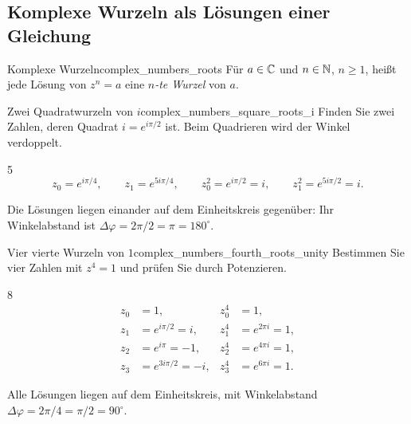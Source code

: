 \clearpage
\subsection{Komplexe Wurzeln als Lösungen einer Gleichung}
\begin{DefinitionBox}{Komplexe Wurzeln}{complex_numbers_roots}
  Für $a\in\mathbb{C}$ und $n\in\mathbb{N}$, $n\ge1$, heißt jede Lösung von $z^n=a$
  eine \emph{$n$-te Wurzel}  von $a$.
\end{DefinitionBox}
\vspace{-0.5\baselineskip}
\begin{ExampleBox}{Zwei Quadratwurzeln von $i$}{complex_numbers_square_roots_i}
  Finden Sie zwei Zahlen, deren Quadrat $i=e^{i\pi/2}$ ist.
  Beim Quadrieren wird der Winkel verdoppelt.
  \begin{ClozeArea}{5}
    \[
      z_0=e^{i\pi/4},\qquad z_1=e^{5i\pi/4},\qquad
      z_0^2=e^{i\pi/2}=i,\qquad z_1^2=e^{5i\pi/2}=i.
    \]
  \end{ClozeArea}
  \begin{center}
  \end{center}
  Die Lösungen liegen einander auf dem Einheitskreis gegenüber:
  Ihr Winkelabstand ist $\Delta\varphi=2\pi/2=\pi=180^\circ$.
\end{ExampleBox}

\begin{ExampleBox}{Vier vierte Wurzeln von $1$}{complex_numbers_fourth_roots_unity}
  Bestimmen Sie vier Zahlen mit $z^4=1$ und prüfen Sie durch Potenzieren.
  \par\smallskip
  \begin{minipage}[c]{0.48\linewidth}
  \end{minipage}\hfill
  \begin{minipage}[c]{0.47\linewidth}
    \begin{ClozeArea}[15]{8}
      \[
        \begin{aligned}
          z_0&=1, &z_0^4&=1,\\[6pt]
          z_1&=e^{i\pi/2}=i, &z_1^4&=e^{2\pi i}=1,\\[6pt]
          z_2&=e^{i\pi}=-1, &z_2^4&=e^{4\pi i}=1,\\[6pt]
          z_3&=e^{3i\pi/2}=-i, &z_3^4&=e^{6\pi i}=1.
        \end{aligned}
      \]
    \end{ClozeArea}
  \end{minipage}
  \par\medskip
  Alle Lösungen liegen auf dem Einheitskreis, mit Winkelabstand
  $\Delta\varphi=2\pi/4=\pi/2=90^\circ$.
\end{ExampleBox}

